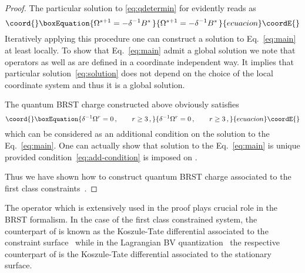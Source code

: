 \documentclass[a4paper,11pt,oneside]{amsart}
\theoremstyle{plain}
\numberwithin{equation}{section} %
\numberwithin{figure}{section} %
\def\cT{{\rm T}}
\begin{document}
\begin{proof}
\noindent
The particular solution
to \eqref{eq:qdetermin} for \coordHE{} evidently reads as
\begin{equation}\coord{}\boxEquation{
\label{eq:solution}
  \Omega^{s+1}=-\delta^{-1}B^s\,
}{
\Omega^{s+1}=-\delta^{-1}B^s\,
}{ecuacion}\coordE{}\end{equation}
Iteratively applying this procedure one can construct a
solution to Eq.~\eqref{eq:main} at least locally.  To
show that Eq.~\eqref{eq:main} admit a global solution we note
that operators \myHighlight{$\delta$}\coordHE{} as well as \coordHE{} are defined in
a coordinate independent way.  It implies that particular
solution~\eqref{eq:solution} does not depend on the choice
of the local coordinate system and thus it is a global solution.



\noindent
The quantum BRST charge constructed above obviously
satisfies
\begin{equation}\coord{}\boxEquation{
\label{eq:add-condition}
 \delta^{-1}\Omega^r=0\,,\qquad r \geq 3 \,,
}{
\delta^{-1}\Omega^r=0\,,\qquad r \geq 3 \,,
}{ecuacion}\coordE{}\end{equation}
which can be considered as an additional condition on
the solution to the Eq.~\eqref{eq:main}.  One can
actually show that solution to the Eq.~\eqref{eq:main} is unique
provided condition~\eqref{eq:add-condition} is imposed
on \myHighlight{$\hat\Omega$}\coordHE{}.

\noindent
Thus we have shown how to
construct quantum BRST charge associated to the first
class constraints~\myHighlight{$\cT_i$}\coordHE{}.
\end{proof}

\noindent
The operator \myHighlight{$\delta$}\coordHE{} which is extensively used in the proof
plays crucial role in the BRST formalism.  In the case of
the first class constrained system, the counterpart of \myHighlight{$\delta$}\coordHE{}
is known as the Koszule-Tate differential associated to the
constraint surface~\cite{[H-omega],[HTS]} while in the Lagrangian
BV quantization~\cite{[BV]} the respective counterpart
of \myHighlight{$\delta$}\coordHE{} is the Koszule-Tate differential associated
to the stationary surface.
\end{document}

